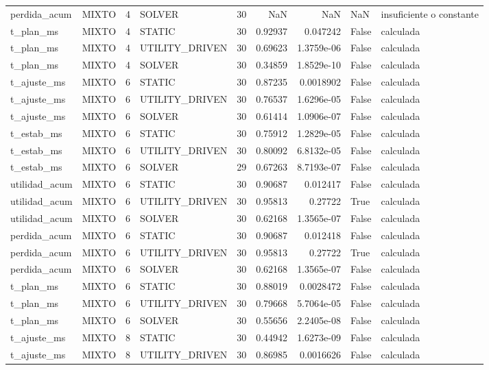 \begin{tabular}{llrlrrrll}
perdida_acum & MIXTO & 4 & SOLVER & 30 & NaN & NaN & NaN & insuficiente o constante \\
t_plan_ms & MIXTO & 4 & STATIC & 30 & 0.92937 & 0.047242 & False & calculada \\
t_plan_ms & MIXTO & 4 & UTILITY_DRIVEN & 30 & 0.69623 & 1.3759e-06 & False & calculada \\
t_plan_ms & MIXTO & 4 & SOLVER & 30 & 0.34859 & 1.8529e-10 & False & calculada \\
t_ajuste_ms & MIXTO & 6 & STATIC & 30 & 0.87235 & 0.0018902 & False & calculada \\
t_ajuste_ms & MIXTO & 6 & UTILITY_DRIVEN & 30 & 0.76537 & 1.6296e-05 & False & calculada \\
t_ajuste_ms & MIXTO & 6 & SOLVER & 30 & 0.61414 & 1.0906e-07 & False & calculada \\
t_estab_ms & MIXTO & 6 & STATIC & 30 & 0.75912 & 1.2829e-05 & False & calculada \\
t_estab_ms & MIXTO & 6 & UTILITY_DRIVEN & 30 & 0.80092 & 6.8132e-05 & False & calculada \\
t_estab_ms & MIXTO & 6 & SOLVER & 29 & 0.67263 & 8.7193e-07 & False & calculada \\
utilidad_acum & MIXTO & 6 & STATIC & 30 & 0.90687 & 0.012417 & False & calculada \\
utilidad_acum & MIXTO & 6 & UTILITY_DRIVEN & 30 & 0.95813 & 0.27722 & True & calculada \\
utilidad_acum & MIXTO & 6 & SOLVER & 30 & 0.62168 & 1.3565e-07 & False & calculada \\
perdida_acum & MIXTO & 6 & STATIC & 30 & 0.90687 & 0.012418 & False & calculada \\
perdida_acum & MIXTO & 6 & UTILITY_DRIVEN & 30 & 0.95813 & 0.27722 & True & calculada \\
perdida_acum & MIXTO & 6 & SOLVER & 30 & 0.62168 & 1.3565e-07 & False & calculada \\
t_plan_ms & MIXTO & 6 & STATIC & 30 & 0.88019 & 0.0028472 & False & calculada \\
t_plan_ms & MIXTO & 6 & UTILITY_DRIVEN & 30 & 0.79668 & 5.7064e-05 & False & calculada \\
t_plan_ms & MIXTO & 6 & SOLVER & 30 & 0.55656 & 2.2405e-08 & False & calculada \\
t_ajuste_ms & MIXTO & 8 & STATIC & 30 & 0.44942 & 1.6273e-09 & False & calculada \\
t_ajuste_ms & MIXTO & 8 & UTILITY_DRIVEN & 30 & 0.86985 & 0.0016626 & False & calculada \\

\end{tabular}
